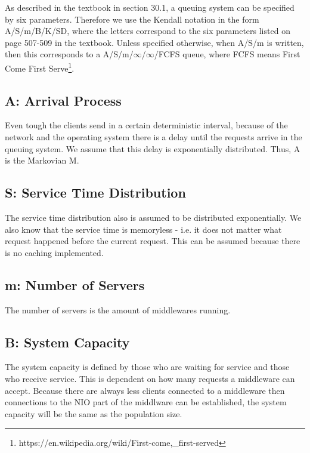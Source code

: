 \documentclass[a4paper]{article}
\begin{document}
As described in the textbook \cite{Raj} in section 30.1, a queuing system can be specified by six parameters. Therefore we use the Kendall notation in the form A/S/m/B/K/SD, where the letters correspond to the six parameters listed on page 507-509 in the textbook\cite{Raj}. Unless specified otherwise, when A/S/m is written, then this corresponds to a A/S/m/$\infty$/$\infty$/FCFS queue, where FCFS means First Come First Serve\footnote{https://en.wikipedia.org/wiki/First-come,\_first-served}.

\subsection{A: Arrival Process}

Even tough the clients send in a certain deterministic interval, because of the network and the operating system there is a delay until the requests arrive in the queuing system. We assume that this delay is exponentially distributed. Thus, A is the Markovian M.

\subsection{S: Service Time Distribution}

The service time distribution also is assumed to be distributed exponentially. We also know that the service time is memoryless - i.e. it does not matter what request happened before the current request. This can be assumed because there is no caching implemented.

\subsection{m: Number of Servers}

The number of servers is the amount of middlewares running.

\subsection{B: System Capacity}

The system capacity is defined by those who are waiting for service and those who receive service.  This is dependent on how many requests a middleware can accept. Because there are always less clients connected to a middleware then connections to the NIO part of the middlware can be established, the system capacity will be the same as the population size.\\
\end{document}
